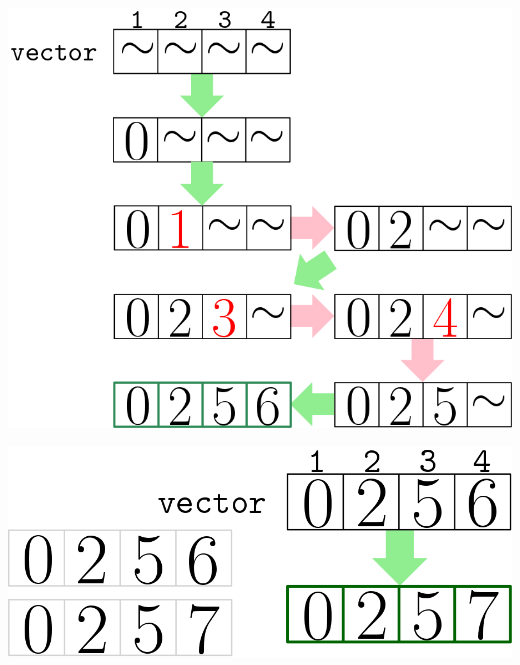 \begin{frame}
\centering
\includegraphics[width=0.8\linewidth]{images/example_algoritmo}
\end{frame}
\begin{frame}
\centering
\includegraphics[width=0.8\linewidth]{images/example_algoritmo2}
\end{frame}
